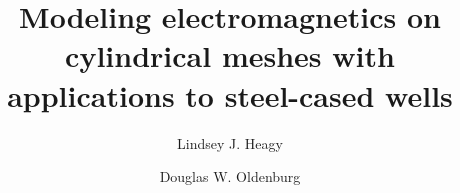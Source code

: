 \documentclass[preprint,review,3p,times,onecolumn,authoryear]{elsarticle}
\begin{document}
\begin{frontmatter}



{%
\title{Modeling electromagnetics on cylindrical meshes with applications to steel-cased wells}

\author[corresponding,UBC]{Lindsey J. Heagy}
\author[UBC]{Douglas W. Oldenburg}

\address[corresponding]{604-836-2715, lheagy@eos.ubc.ca}
\address[UBC]{Geophysical Inversion Facility, University of British Columbia}




\begin{abstract}


\end{abstract}}
\end{frontmatter}
\end{document}
